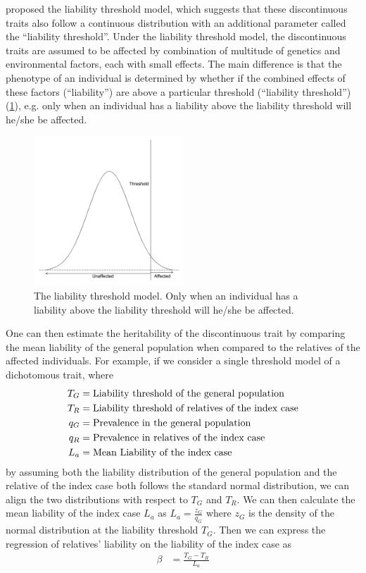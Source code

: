 	\citet{Falconer1965} proposed the liability threshold model, which suggests that these discontinuous traits also follow a continuous distribution with an additional parameter called the ``liability threshold''.
	Under the liability threshold model, the discontinuous traits are assumed to be affected by combination of multitude of genetics and environmental factors, each with small effects.
	The main difference is that the phenotype of an individual is determined by whether if the combined effects of these factors (``liability'') are above a particular threshold (``liability threshold'') (\cref{fig:liability}), e.g. only when an individual has a liability above the liability threshold will he/she be affected.
	\begin{figure}
		\centering
		\includegraphics[width=0.5\textwidth]{figure/liability.png}
		\caption[Liability Threshold Model]{
			The liability threshold model.
			Only when an individual has a liability above the liability threshold will he/she be affected.
			}
			\label{fig:liability}
	\end{figure}
	One can then estimate the heritability of the discontinuous trait by comparing the mean liability of the general population when compared to the relatives of the affected individuals.	
	For example, if we consider a single threshold model of a dichotomous trait, where 
	\begin{align}
	T_G &= \text{Liability threshold of the general population}\notag\\
	T_R &= \text{Liability threshold of relatives of the index case} \notag\\
	q_G &= \text{Prevalence in the general population}\notag\\
	q_R &= \text{Prevalence in relatives of the index case}\notag\\
	L_a &= \text{Mean Liability of the index case} \notag
	\end{align}
	by assuming both the liability distribution of the general population and the relative of the index case both follows the standard normal distribution, we can align the two distributions with respect to $T_G$ and $T_R$. 
	We can then calculate the mean liability of the index case $L_a$ as $L_a=\frac{z_G}{q_G}$ where $z_G$ is the density of the normal distribution at the liability threshold $T_G$.
	Then we can express the regression of relatives' liability on the liability of the index case as
	\begin{align}
	\beta &= \frac{T_G-T_R}{L_a}
	\label{eq:liability}
	\end{align}
	
